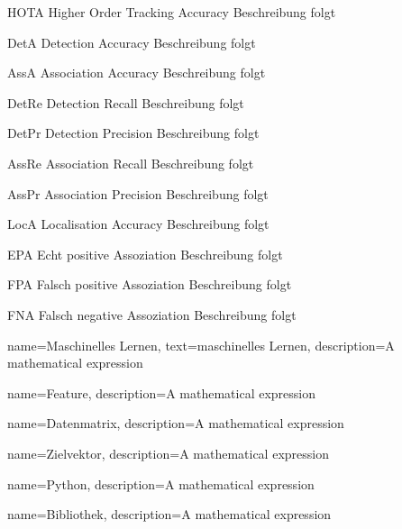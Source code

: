 \newglossaryentrywithacronym
{HOTA}
{Higher Order Tracking Accuracy}
{Beschreibung folgt}

\newglossaryentrywithacronym
{DetA}
{Detection Accuracy}
{Beschreibung folgt}

\newglossaryentrywithacronym
{AssA}
{Association Accuracy}
{Beschreibung folgt}

\newglossaryentrywithacronym
{DetRe}
{Detection Recall}
{Beschreibung folgt}

\newglossaryentrywithacronym
{DetPr}
{Detection Precision}
{Beschreibung folgt}

\newglossaryentrywithacronym
{AssRe}
{Association Recall}
{Beschreibung folgt}

\newglossaryentrywithacronym
{AssPr}
{Association Precision}
{Beschreibung folgt}

\newglossaryentrywithacronym
{LocA}
{Localisation Accuracy}
{Beschreibung folgt}

\newglossaryentrywithacronym
{EPA}
{Echt positive Assoziation}
{Beschreibung folgt}

\newglossaryentrywithacronym
{FPA}
{Falsch positive Assoziation}
{Beschreibung folgt}

\newglossaryentrywithacronym
{FNA}
{Falsch negative Assoziation}
{Beschreibung folgt}


{
        name=Maschinelles Lernen,
        text=maschinelles Lernen,
        description={A mathematical expression}
}

{
        name=Feature,
        description={A mathematical expression}
}

{
        name=Datenmatrix,
        description={A mathematical expression}
}

{
        name=Zielvektor,
        description={A mathematical expression}
}


{
        name=Python,
        description={A mathematical expression}
}

{
        name=Bibliothek,
        description={A mathematical expression}
}





